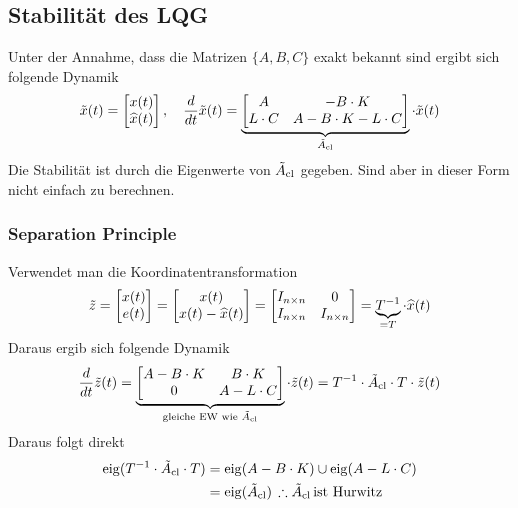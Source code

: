 \subsection{Stabilität des LQG}
    Unter der Annahme, dass die Matrizen $\{A, B, C\}$ exakt bekannt sind ergibt sich folgende Dynamik
    \begin{equation*}
        \Tilde{x}(t) = \begin{bmatrix}x(t)\\\widehat{x}(t)\end{bmatrix},\quad
        \frac{d}{dt}\Tilde{x}(t) = 
        \underbrace{\begin{bmatrix}
        A   &   -B\cdot K\\
        L\cdot C & A-B\cdot K-L\cdot C
        \end{bmatrix}}_{\Tilde{A}_{\textnormal{cl}}}
        \cdot \Tilde{x}(t)
    \end{equation*}
    Die Stabilität ist durch die Eigenwerte von $\Tilde{A}_{\textnormal{cl}}$ gegeben. Sind aber in dieser Form nicht einfach zu berechnen.
    
    \subsubsection{Separation Principle}
        Verwendet man die Koordinatentransformation
        \begin{equation*}
            \Tilde{z} = 
            \begin{bmatrix}
            x(t)\\e(t)
            \end{bmatrix}
            =
            \begin{bmatrix}
            x(t)\\x(t)-\widehat{x}(t)
            \end{bmatrix}
            =
            \begin{bmatrix}
            I_{n\times n} & 0\\I_{n\times n} & I_{n\times n}
            \end{bmatrix}
            = \underbrace{T^{-1}}_{=T}\cdot\widehat{x}(t)
        \end{equation*}
        Daraus ergib sich folgende Dynamik
        \begin{equation*} 
            \frac{d}{dt}\Tilde{z}(t) = 
            \underbrace{\begin{bmatrix}
            A-B\cdot K   &   B\cdot K\\
            0 & A-L\cdot C
            \end{bmatrix}}_{\textnormal{gleiche EW wie }\Tilde{A}_{\textnormal{cl}}}
            \cdot\Tilde{z}(t) = T^{-1}\cdot\Tilde{A}_\textnormal{cl}\cdot T\cdot\Tilde{z}(t)
        \end{equation*}
        Daraus folgt direkt
        \begin{align*}
            \operatorname{eig}(T^{-1}\cdot\Tilde{A}_\textnormal{cl}\cdot T) &= \operatorname{eig}(A-B\cdot K)\cup \operatorname{eig}(A-L\cdot C)\\ &= \operatorname{eig}(\Tilde{A}_\textnormal{cl})\,\therefore \Tilde{A}_\textnormal{cl}\,\textnormal{ist Hurwitz}
        \end{align*}